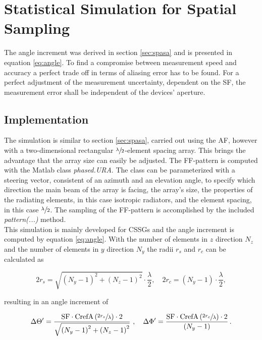 \chapter{Statistical Simulation for Spatial Sampling}

The angle increment was derived in section \ref{sec:spasa} and is presented in equation \ref{eq:angle}. To find a compromise between measurement speed and accuracy a perfect trade off in terms of aliasing error has to be found. For a perfect adjustment of the measurement uncertainty, dependent on the \ac{SF}, the measurement error shall be independent of the devices' aperture.

\section{Implementation}

The simulation is similar to section \ref{sec:spasa}, carried out using the \ac{AF}, however with a two-dimensional rectangular $\sfrac{\lambda}{2}$-element spacing array. This brings the advantage that the array size can easily be adjusted. The \ac{FF}-pattern is computed with the Matlab\texttrademark{} class \textit{phased.URA}.
The class can be parameterized with a steering vector, consistent of an azimuth and an elevation angle, to specify which direction the main beam of the array is facing, the array's size, the properties of the radiating elements, in this case isotropic radiators, and the element spacing, in this case $\sfrac{\lambda}{2}$.
The sampling of the \ac{FF}-pattern is accomplished by the included \textit{pattern(...)} method.\\
This simulation is mainly developed for \acp{CSSG} and the angle increment is computed by equation \ref{eq:angle}. With the number of elements in $z$ direction $N_z$ and the number of elements in $y$ direction $N_y$ the radii $r_s$ and $r_c$ can be calculated as

\begin{equation}
2r_s = \sqrt{\left(N_y-1\right)^2+\left(N_z-1\right)^2}\cdot\frac{\lambda}{2},\quad 2r_c=\left(N_y-1\right)\cdot\frac{\lambda}{2},
\end{equation}

resulting in an angle increment of

\begin{equation}
\Delta\Theta^\prime = \frac{\text{SF}\cdot\text{CrefA}\left(\sfrac{2r_s}{\lambda}\right)\cdot 2}{\sqrt{\left(N_y-1\right)^2+\left(N_z-1\right)^2}}\ ,\quad\Delta\Phi^\prime = \frac{\text{SF}\cdot\text{CrefA}\left(\sfrac{2r_c}{\lambda}\right)\cdot 2}{\left(N_y-1\right)}\,.
\end{equation}

